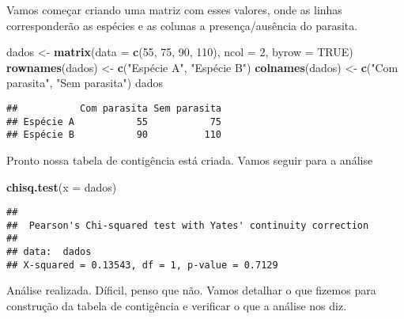 \documentclass[14pt,titlepage, oneside, openany, a4paper]{book}
\newenvironment{Shaded}{\begin{snugshade}}{\end{snugshade}}
\newcommand{\DataTypeTok}[1]{\textcolor[rgb]{0.13,0.29,0.53}{#1}}
\newcommand{\DecValTok}[1]{\textcolor[rgb]{0.00,0.00,0.81}{#1}}
\newcommand{\KeywordTok}[1]{\textcolor[rgb]{0.13,0.29,0.53}{\textbf{#1}}}
\newcommand{\NormalTok}[1]{#1}
\newcommand{\OtherTok}[1]{\textcolor[rgb]{0.56,0.35,0.01}{#1}}
\newcommand{\StringTok}[1]{\textcolor[rgb]{0.31,0.60,0.02}{#1}}
\begin{document}
Vamos começar criando uma matriz com esses valores, onde as linhas corresponderão as espécies e as colunas a presença/ausência do parasita.

\begin{Shaded}
\begin{Highlighting}[]
\NormalTok{dados <-}\StringTok{ }\KeywordTok{matrix}\NormalTok{(}\DataTypeTok{data =} \KeywordTok{c}\NormalTok{(}\DecValTok{55}\NormalTok{, }\DecValTok{75}\NormalTok{, }\DecValTok{90}\NormalTok{, }\DecValTok{110}\NormalTok{), }\DataTypeTok{ncol =} \DecValTok{2}\NormalTok{, }\DataTypeTok{byrow =} \OtherTok{TRUE}\NormalTok{)}
\KeywordTok{rownames}\NormalTok{(dados) <-}\StringTok{ }\KeywordTok{c}\NormalTok{(}\StringTok{"Espécie A"}\NormalTok{, }\StringTok{"Espécie B"}\NormalTok{)}
\KeywordTok{colnames}\NormalTok{(dados) <-}\StringTok{ }\KeywordTok{c}\NormalTok{(}\StringTok{"Com parasita"}\NormalTok{, }\StringTok{"Sem parasita"}\NormalTok{)}
\NormalTok{dados}
\end{Highlighting}
\end{Shaded}

\begin{verbatim}
##           Com parasita Sem parasita
## Espécie A           55           75
## Espécie B           90          110
\end{verbatim}

Pronto nossa tabela de contigência está criada. Vamos seguir para a análise

\begin{Shaded}
\begin{Highlighting}[]
\KeywordTok{chisq.test}\NormalTok{(}\DataTypeTok{x =}\NormalTok{ dados)}
\end{Highlighting}
\end{Shaded}

\begin{verbatim}
## 
##  Pearson's Chi-squared test with Yates' continuity correction
## 
## data:  dados
## X-squared = 0.13543, df = 1, p-value = 0.7129
\end{verbatim}

Análise realizada. Díficil, penso que não. Vamos detalhar o que fizemos para construção da tabela de contigência e verificar o que a análise nos diz.
\end{document}
